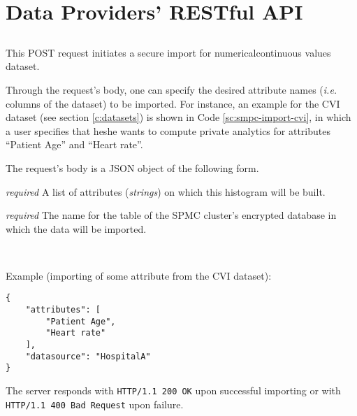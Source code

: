 \section{Data Providers' RESTful API}\label{s:data-providers-api}

\subsection[/smpc/import/numerical POST request]{\protect{}}\label{s:post4}
This POST request initiates a secure import for numerical\myslash continuous values dataset.
\begin{description}[labelwidth=5em, leftmargin=\dimexpr\labelwidth+\labelsep\relax]
\item[Request:] Through the request's body, one can specify the desired attribute names (\textit{i.e.} columns of the dataset) to be imported.
For instance, an example for the CVI dataset (see section \ref{c:datasets}) is shown in Code \ref{sc:smpc-import-cvi}, in which a user specifies that he\myslash she wants to compute private analytics for attributes ``Patient Age'' and ``Heart rate''.

The request's body is a JSON object of the following form.

\begin{description}[labelwidth=6em, leftmargin=\dimexpr\labelwidth+\labelsep\relax]

    \item[\texttt{attributes}:] {\color{red}\textit{required}} A list of attributes (\textit{strings}) on which this histogram will be built.

    \item[\texttt{datasource}:] {\color{red}\textit{required}} The name for the table of the SPMC cluster's encrypted database in which the data  will be imported.

\end{description}

\ \\
\begin{minipage}{\linewidth}
  Example (importing of some attribute from the CVI dataset):\\
{
\begin{verbatim}
{
    "attributes": [
        "Patient Age",
        "Heart rate"
    ],
    "datasource": "HospitalA"
}
\end{verbatim}
\label{sc:smpc-import-cvi}
}
\end{minipage}


\item[Response:] The server responds with \texttt{HTTP/1.1 200 OK} upon successful importing or with \texttt{HTTP/1.1 400 Bad Request} upon failure.
\end{description}




